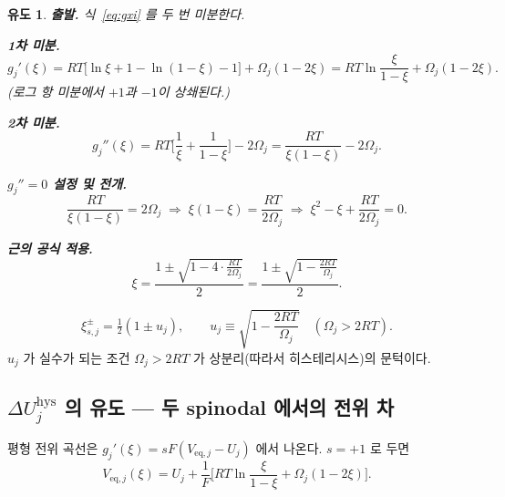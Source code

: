 \documentclass[11pt,a4paper]{article}
\newtheorem*{derivebox}{유도}
\newcommand{\eq}{\mathrm{eq}}
\newcommand{\hys}{\mathrm{hys}}
\begin{document}
\begin{derivebox}
\textbf{출발.} 식~\eqref{eq:gxi} 를 두 번 미분한다.

\textbf{1차 미분.}
\begin{equation*}
g_j'(\xi)=RT\Big[\ln\xi+1-\ln(1-\xi)-1\Big]+\Omega_j(1-2\xi)
=RT\ln\frac{\xi}{1-\xi}+\Omega_j(1-2\xi).
\end{equation*}
(로그 항 미분에서 $+1$과 $-1$이 상쇄된다.)

\textbf{2차 미분.}
\begin{equation*}
g_j''(\xi)=RT\Big[\frac{1}{\xi}+\frac{1}{1-\xi}\Big]-2\Omega_j
=\frac{RT}{\xi(1-\xi)}-2\Omega_j.
\end{equation*}

\textbf{$g_j''=0$ 설정 및 전개.}
\begin{equation*}
\frac{RT}{\xi(1-\xi)}=2\Omega_j
\;\Longrightarrow\;
\xi(1-\xi)=\frac{RT}{2\Omega_j}
\;\Longrightarrow\;
\xi^2-\xi+\frac{RT}{2\Omega_j}=0.
\end{equation*}

\textbf{근의 공식 적용.}
\begin{equation*}
\xi=\frac{1\pm\sqrt{1-4\cdot\frac{RT}{2\Omega_j}}}{2}
=\frac{1\pm\sqrt{1-\frac{2RT}{\Omega_j}}}{2}.
\end{equation*}
\end{derivebox}
\begin{equation}
\xi_{s,j}^\pm=\tfrac12(1\pm u_j),\qquad
u_j\equiv\sqrt{1-\frac{2RT}{\Omega_j}}\quad(\Omega_j>2RT).
\label{eq:spinodal}
\end{equation}
$u_j$ 가 실수가 되는 조건 $\Omega_j>2RT$ 가 상분리(따라서 히스테리시스)의 문턱이다.

\subsection{$\Delta U_j^\hys$ 의 유도 — 두 spinodal 에서의 전위 차}

평형 전위 곡선은 $g_j'(\xi)=sF(V_{\eq,j}-U_j)$ 에서 나온다. $s=+1$ 로 두면
\begin{equation}
V_{\eq,j}(\xi)=U_j+\frac{1}{F}\Big[RT\ln\frac{\xi}{1-\xi}+\Omega_j(1-2\xi)\Big].
\label{eq:Veq}
\end{equation}
\end{document}
